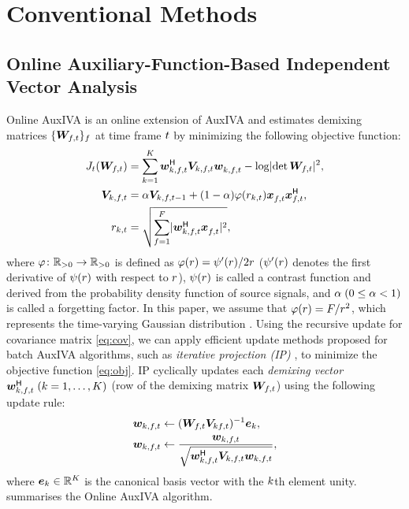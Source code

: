 \documentclass[sip,biber]{now-journal}
\begin{document}
\section{Conventional Methods}\label{sec:conventional}

\subsection{Online Auxiliary-Function-Based Independent Vector Analysis}\label{subsec:oiva}

Online AuxIVA \cite{Taniguchi:2014:HSCMA} is an online extension of AuxIVA \cite{Ono:2011:WASPAA} and estimates demixing matrices $\{\Demix _{\ft}\} _{\freq}$ at time frame $t$ by minimizing the following objective function:
\begin{align}
  J _{\tframe}(\Demix _{\ft}) &= \sum _{\src = 1} ^{\Src} \demix _{\src,\ft} ^{\hermite} \cov _{\src,\ft} \demix _{\src,\ft} ^{\nohermite} - \logdet{\Demix _{\ft}} ^2, \label{eq:obj} \\
  \cov _{\src,\ft} &= \forget \cov _{\src,\ft[-1]} + (1 - \forget) \weight(\var _{\src,\tframe}) \Obs _{\ft} ^{\nohermite} \Obs _{\ft} ^{\hermite}, \label{eq:cov} \\
  \var _{\src,\tframe} &= \sqrt{\sum _{\freq=1} ^{\Freq} \lvert \demix ^{\hermite} _{\src,\ft} \Obs ^{\nohermite}_{\ft} \rvert ^2},
\end{align}
where $\varphi\colon \mathbb{R} _{>0} \to \mathbb{R} _{>0}$ is defined as $\varphi(r) = \psi ' (r) / 2 r$ ($\psi '(r)$ denotes the first derivative of $\psi (r)$ with respect to $r$),
$\psi(r)$ is called a contrast function and derived from the probability density function of source signals,
and $\alpha\; (0 \leq \alpha < 1)$ is called a forgetting factor.
In this paper, we assume that $\varphi (r) = F/{r ^2}$, which represents the time-varying Gaussian distribution \cite{Ono:2012:APSIPA}.
Using the recursive update for covariance matrix \eqref{eq:cov}, we can apply efficient update methods proposed for batch AuxIVA algorithms, such as \emph{iterative projection (IP)} \cite{Ono:2011:WASPAA}, to minimize the objective function \eqref{eq:obj}.
IP cyclically updates each \emph{demixing vector} $\demix _{\src,\ft} ^{\hermite}\; (\src = 1, \dots, \Src)$ (row of the demixing matrix $\Demix _{\ft}$) using the following update rule:
\begin{align}
  \demix _{\src,\ft} &\gets (\Demix _{\ft} \cov _{\src\ft}) ^{-1} \eye _{\src} \label{eq:ip:proj}, \\
  \demix _{\src,\ft} &\gets \frac{{\demix _{\src,\ft}}}{{\sqrt{\demix _{\src,\ft} ^{\hermite} \cov _{\src,\ft} \demix _{\src,\ft}}}} \label{eq:ip:norm},
\end{align}
where $\bm{e} _{k} \in \mathbb{R} ^{K}$ is the canonical basis vector with the $k$th element unity.
 summarises the Online AuxIVA algorithm.
\end{document}
